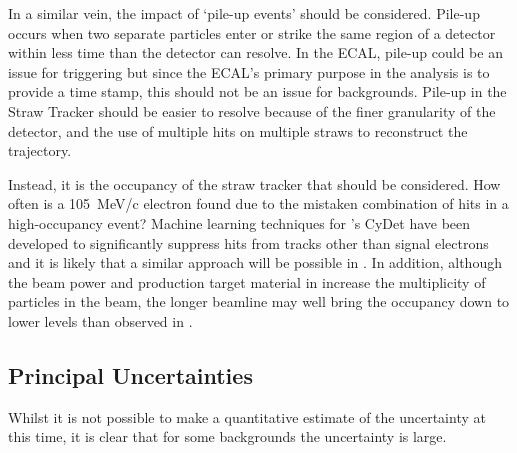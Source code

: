 In a similar vein, the impact of `pile-up events' should be considered.
Pile-up occurs when two separate particles enter or strike the same region of a detector within less time than the detector can resolve.
In the ECAL, pile-up could be an issue for triggering but since the ECAL's primary purpose in the analysis is to provide a time stamp, this should not be an issue for backgrounds.
Pile-up in the Straw Tracker should be easier to resolve because of the finer granularity of the detector, and the use of multiple hits on multiple straws to reconstruct the trajectory.

Instead, it is the occupancy of the straw tracker that should be considered.  
How often is a 105~MeV/c electron found due to the mistaken combination of hits in a high-occupancy event?
Machine learning techniques for \phaseI's \ac{CyDet} have been developed to significantly suppress hits from tracks other than signal electrons and it is likely that a similar approach will be possible in \phaseII.
In addition, although the beam power and production target material in \phaseII increase the multiplicity of particles in the beam, the longer beamline may well bring the occupancy down to lower levels than observed in \phaseI.


\subsection{Principal Uncertainties}
Whilst it is not possible to make a quantitative estimate of the uncertainty at this time, it is clear that for some backgrounds the uncertainty is large.

